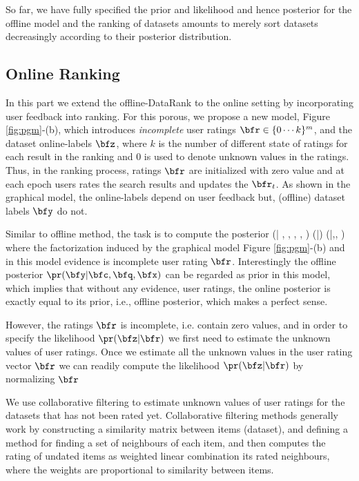 \documentclass[twoside,11pt]{article}
\begin{document}
So far, we have fully specified the prior and likelihood and hence posterior for the offline model and the ranking of datasets amounts to merely sort datasets decreasingly according to their posterior distribution.
\subsection{Online Ranking}
In this part we extend the offline-DataRank to the online setting by incorporating user feedback into ranking. For this porous, we propose a new model, Figure \ref{fig:pgm}-(b), which introduces \emph{incomplete} user ratings $\bfr\in \{0\cdots k \}^{m}$, and the dataset online-labels $\bfz$, where $k$ is the number of different state of ratings for each result in the ranking and 0 is used to denote unknown values in the ratings. Thus, in the ranking process, ratings $\bfr$ are initialized with zero value and at each epoch users rates the search results and updates the $\bfr_t$. As shown in the graphical model, the online-labels depend on user feedback but, (offline) dataset labels $\bfy$ do not. 

 Similar to offline method, the task is to compute the posterior
\beq \label{eq:online-posterior}
\pr (\bfz | \bfr, \bfy, \bfc, \bfq, \bfx)  \propto  \pr (\bfz |\bfr) \pr (\bfy |\bfc,\bfq, \bfx)
\eeq
where the factorization induced by the graphical model Figure \ref{fig:pgm}-(b) and in this model evidence is incomplete user rating $\bfr$. Interestingly the offline posterior $\pr (\bfy |\bfc,\bfq, \bfx)$ can be regarded as prior in this model, which implies that without any evidence, user ratings, the online posterior is exactly equal to its prior, i.e., offline posterior, which makes a perfect sense.

However, the ratings $\bfr$ is incomplete, i.e. contain zero values, and in order to specify the likelihood $\pr (\bfz |\bfr)$ we first need to estimate the unknown values of user ratings. Once we estimate all the unknown values in the user rating vector $\bfr$  we can readily  compute the likelihood $\pr (\bfz |\bfr)$ by normalizing $\bfr$

We use collaborative filtering \cite{CF-survey} to estimate unknown values of user ratings for the datasets that has not been rated yet. Collaborative filtering methods generally work by constructing a similarity matrix between items (dataset), and defining a method for finding a set of neighbours of each item, and then computes the rating of undated items as weighted linear combination its rated neighbours, where the weights are proportional to similarity between items.
\end{document}
